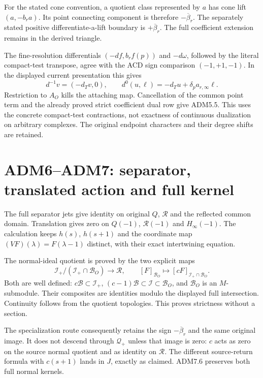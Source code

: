 For the stated cone convention, a quotient class represented by \(a\)
has cone lift \((a,-b_ra)\). Its point connecting component is therefore
\(-\overline\beta_r\). The separately stated positive
differentiate-a-lift boundary is \(+\overline\beta_r\). The full
coefficient extension remains in the derived triangle.

The fine-resolution differentials \((-df,b_rf(p))\) and \(-d\omega\),
followed by the literal compact-test transpose, agree with the ACD sign
comparison \((-1,+1,-1)\). In the displayed current presentation this
gives \[
d^{-1}v=(-d_Tv,0),\qquad
d^0(u,\ell)=-d_Tu+\delta_pa_{r,\infty}\ell.
\] Restriction to \(A_O\) kills the attaching map. Cancellation of the
common point term and the already proved strict coefficient dual row
give ADM5.5. This uses the concrete compact-test contractions, not
exactness of continuous dualization on arbitrary complexes. The original
endpoint characters and their degree shifts are retained.

\section{ADM6--ADM7: separator, translated action and full
kernel}\label{adm6adm7-separator-translated-action-and-full-kernel}

The full separator jets give identity on original \(Q\), \(\mathcal R\)
and the reflected common domain. Translation gives zero on \(Q(-1)\),
\(\mathcal R(-1)\) and \(H_\infty(-1)\). The calculation keeps \(h(s)\),
\(h(s+1)\) and the coordinate map \((VF)(\lambda)=F(\lambda-1)\)
distinct, with their exact intertwining equation.

The normal-ideal quotient is proved by the two explicit maps \[
\mathcal I_+/(\mathcal I_+\cap\mathcal B_O)
\longrightarrow\mathcal R,
\qquad
[F]_{\mathcal B_O}\longmapsto[cF]_{\mathcal I_+\cap\mathcal B_O}.
\] Both are well defined: \(c\mathcal B\subset\mathcal I_+\),
\((c-1)\mathcal B\subset\mathcal I\subset\mathcal B_O\), and
\(\mathcal B_O\) is an \(M\)-submodule. Their composites are identities
modulo the displayed full intersection. Continuity follows from the
quotient topologies. This proves strictness without a section.

The specialization route consequently retains the sign
\(-\overline\beta_r\) and the same original image. It does not descend
through \(\mathcal Q_+\) unless that image is zero: \(c\) acts as zero
on the source normal quotient and as identity on \(\mathcal R\). The
different source-return formula with \(c(s+1)\) lands in \(J\), exactly
as claimed. ADM7.6 preserves both full normal kernels.

